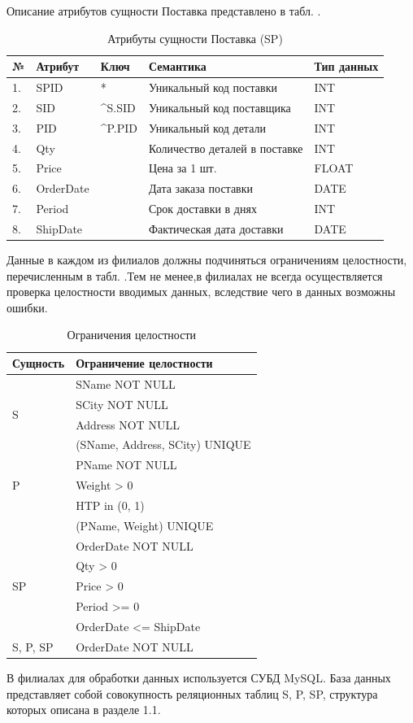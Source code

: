 Описание атрибутов сущности  Поставка представлено в табл. .
\begin{table}[h]
	\caption{\space Атрибуты сущности Поставка (SP)}
	\label{relation}
	\begin{tabular}{|p{0.4cm}|p{2.5cm}|p{1.5cm}|p{6.3cm}|p{3.2cm}|}
		\hline
		\textbf{№} & \textbf{Атрибут} & \textbf{Ключ} & \textbf{Семантика} & \textbf{Тип данных} \\
		\hline
		1. & SPID & * & Уникальный код поставки & INT \\
		\hline
		2. & SID & \textasciicircum S.SID & Уникальный код поставщика & INT \\
		\hline
		3. & PID & \textasciicircum P.PID & Уникальный код детали & INT \\
		\hline
		4. & Qty & & Количество деталей в поставке & INT \\
		\hline
		5. & Price & & Цена за 1 шт. & FLOAT \\
		\hline
		6. & OrderDate & & Дата заказа поставки & DATE \\
		\hline
		7. & Period & & Срок доставки в днях & INT \\
		\hline
		8. & ShipDate & & Фактическая дата доставки & DATE \\
		\hline
	\end{tabular}
\end{table}

Данные  в  каждом из  филиалов  должны  подчиняться ограничениям целостности, 
перечисленным в табл. .Тем не менее,в филиалах не всегда 
осуществляется проверка целостности вводимых данных, вследствие чего в данных 
возможны ошибки.
\begin{table}[h]
	\caption{\space Ограничения целостности}
	\label{integrity}
	\begin{tabular}{|p{4cm}|p{8cm}|}
		\hline
		\textbf{Сущность} & \textbf{Ограничение целостности} \\
		\hline
		\multirow{4}{*}{S} 	& SName NOT NULL \\
					& SCity NOT NULL \\
					& Address NOT NULL \\
					& (SName, Address, SCity) UNIQUE \\
		\hline
		\multirow{3}{*}{P}	& PName NOT NULL\\
					& Weight > 0\\
					& HTP in (0, 1) \\
					& (PName, Weight) UNIQUE \\
		\hline
		\multirow{5}{*}{SP}	& OrderDate NOT NULL \\
					& Qty > 0 \\
					& Price > 0 \\
					& Period >= 0 \\
					& OrderDate <= ShipDate \\
		\hline
		S, P, SP		& OrderDate NOT NULL \\
		\hline
	\end{tabular}
\end{table}
В филиалах для обработки данных используется СУБД MySQL. База данных представляет собой совокупность реляционных таблиц S, P, SP, структура которых описана в разделе 1.1.\par


